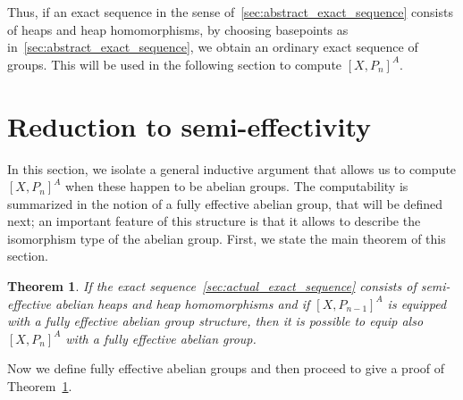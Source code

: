 \documentclass[12pt,a4wide]{article}
\theoremstyle{plain}
\newtheorem{theorem}{Theorem}[section]
\theoremstyle{definition}
\newcommand{\heading}[1]{\vspace{1ex}\par\noindent{\bf\boldmath #1}}
\newcommand{\thedim}{{n}}
\newcommand{\Pnew}{{P_\thedim}}
\newcommand{\Pold}{{P_{\thedim-1}}}
\renewcommand\:{\colon}
\begin{document}
\heading{Exact sequences of heaps}

Thus, if an exact sequence in the sense of~\ref{sec:abstract_exact_sequence} consists of heaps and heap homomorphisms, by choosing basepoints as in~\ref{sec:abstract_exact_sequence}, we obtain an ordinary exact sequence of groups. This will be used in the following section to compute $[X,\Pnew]^A$.


\section{Reduction to semi-effectivity}

In this section, we isolate a general inductive argument that allows us to compute $[X, \Pnew]^A$ when these happen to be abelian groups. The computability is summarized in the notion of a fully effective abelian group, that will be defined next; an important feature of this structure is that it allows to describe the isomorphism type of the abelian group. First, we state the main theorem of this section.

\begin{theorem}\label{thm:inductive_step}
If the exact sequence~\ref{sec:actual_exact_sequence} consists of semi-effective abelian heaps and heap homomorphisms and if $[X, \Pold]^A$ is equipped with a fully effective abelian group structure, then it is possible to equip also $[X, \Pnew]^A$ with a fully effective abelian group.
\end{theorem}

Now we define fully effective abelian groups and then proceed to give a proof of Theorem~\ref{thm:inductive_step}.


%
\end{document}
